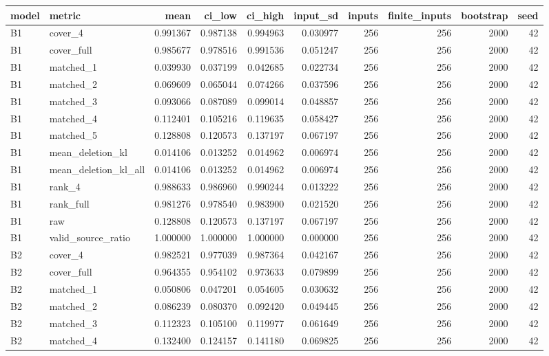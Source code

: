 \begin{tabular}{llrrrrrrrr}
\toprule
model & metric & mean & ci_low & ci_high & input_sd & inputs & finite_inputs & bootstrap & seed \\
\midrule
B1 & cover_4 & 0.991367 & 0.987138 & 0.994963 & 0.030977 & 256 & 256 & 2000 & 42 \\
B1 & cover_full & 0.985677 & 0.978516 & 0.991536 & 0.051247 & 256 & 256 & 2000 & 42 \\
B1 & matched_1 & 0.039930 & 0.037199 & 0.042685 & 0.022734 & 256 & 256 & 2000 & 42 \\
B1 & matched_2 & 0.069609 & 0.065044 & 0.074266 & 0.037596 & 256 & 256 & 2000 & 42 \\
B1 & matched_3 & 0.093066 & 0.087089 & 0.099014 & 0.048857 & 256 & 256 & 2000 & 42 \\
B1 & matched_4 & 0.112401 & 0.105216 & 0.119635 & 0.058427 & 256 & 256 & 2000 & 42 \\
B1 & matched_5 & 0.128808 & 0.120573 & 0.137197 & 0.067197 & 256 & 256 & 2000 & 42 \\
B1 & mean_deletion_kl & 0.014106 & 0.013252 & 0.014962 & 0.006974 & 256 & 256 & 2000 & 42 \\
B1 & mean_deletion_kl_all & 0.014106 & 0.013252 & 0.014962 & 0.006974 & 256 & 256 & 2000 & 42 \\
B1 & rank_4 & 0.988633 & 0.986960 & 0.990244 & 0.013222 & 256 & 256 & 2000 & 42 \\
B1 & rank_full & 0.981276 & 0.978540 & 0.983900 & 0.021520 & 256 & 256 & 2000 & 42 \\
B1 & raw & 0.128808 & 0.120573 & 0.137197 & 0.067197 & 256 & 256 & 2000 & 42 \\
B1 & valid_source_ratio & 1.000000 & 1.000000 & 1.000000 & 0.000000 & 256 & 256 & 2000 & 42 \\
B2 & cover_4 & 0.982521 & 0.977039 & 0.987364 & 0.042167 & 256 & 256 & 2000 & 42 \\
B2 & cover_full & 0.964355 & 0.954102 & 0.973633 & 0.079899 & 256 & 256 & 2000 & 42 \\
B2 & matched_1 & 0.050806 & 0.047201 & 0.054605 & 0.030632 & 256 & 256 & 2000 & 42 \\
B2 & matched_2 & 0.086239 & 0.080370 & 0.092420 & 0.049445 & 256 & 256 & 2000 & 42 \\
B2 & matched_3 & 0.112323 & 0.105100 & 0.119977 & 0.061649 & 256 & 256 & 2000 & 42 \\
B2 & matched_4 & 0.132400 & 0.124157 & 0.141180 & 0.069825 & 256 & 256 & 2000 & 42 \\

\end{tabular}
